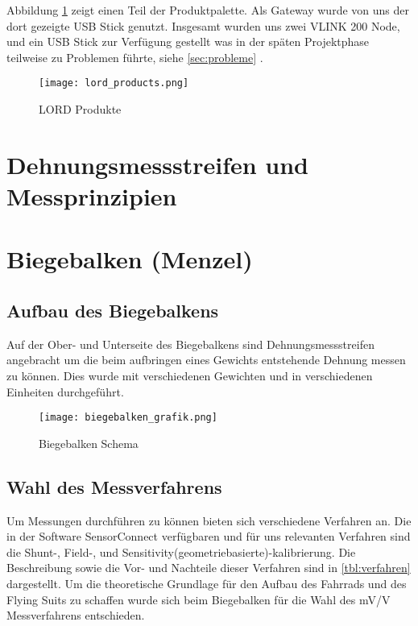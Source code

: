 Abbildung \ref{fig:lordproducts} zeigt einen Teil der Produktpalette.
Als Gateway wurde von uns der dort gezeigte USB Stick genutzt.
Insgesamt wurden uns zwei VLINK 200 Node, und ein USB Stick zur Verfügung gestellt was in der späten Projektphase teilweise zu Problemen führte,
siehe \ref{sec:probleme} .

\begin{figure}[h]
    \begin{center}
        \texttt{[image: lord\_products.png]}
        \caption[LORD Produkte (Abbildungsverzeichnis)]{LORD Produkte
        \cite{VLInkManual}
        }
        \label{fig:lordproducts}
    \end{center}
\end{figure}

\section{Dehnungsmessstreifen und Messprinzipien}




\section{Biegebalken (Menzel)}
\subsection{Aufbau des Biegebalkens}
Auf der Ober- und Unterseite des Biegebalkens sind Dehnungsmessstreifen angebracht um die beim aufbringen eines Gewichts entstehende Dehnung messen zu können.
Dies wurde mit verschiedenen Gewichten und in verschiedenen Einheiten durchgeführt.
\begin{figure}[h]
    \begin{center}
        \texttt{[image: biegebalken\_grafik.png]}
        \caption[Biegebalken Schema (Abbildungsverzeichnis)]{Biegebalken Schema
        }
        \label{fig:biegebalkenschema}
    \end{center}
\end{figure}

\subsection{Wahl des Messverfahrens}
Um Messungen durchführen zu können bieten sich verschiedene Verfahren an.
Die in der Software SensorConnect verfügbaren und für uns relevanten Verfahren sind die Shunt-, Field-, und Sensitivity(geometriebasierte)-kalibrierung.
Die Beschreibung sowie die Vor- und Nachteile dieser Verfahren sind in \ref{tbl:verfahren}  dargestellt.
Um die theoretische Grundlage für den Aufbau des Fahrrads und des Flying Suits zu schaffen wurde sich beim Biegebalken für die Wahl des mV/V Messverfahrens entschieden.

